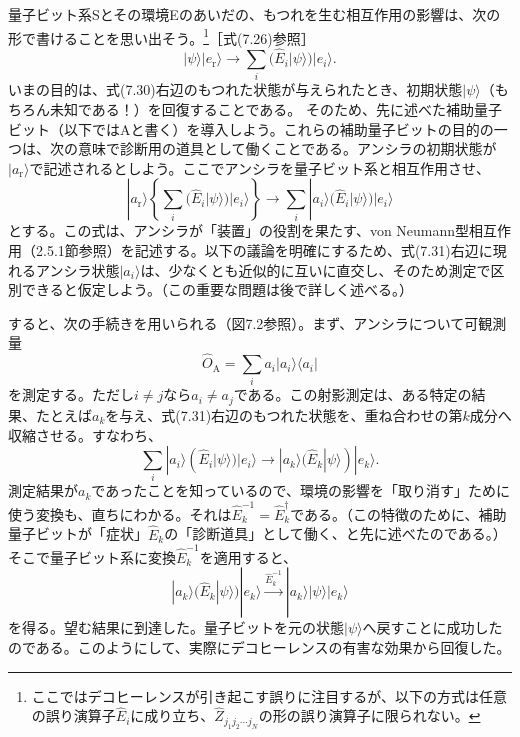 量子ビット系Sとその環境Eのあいだの、もつれを生む相互作用の影響は、次の形で書けることを思い出そう。\footnote{ここではデコヒーレンスが引き起こす誤りに注目するが、以下の方式は任意の誤り演算子$\hat E_i$に成り立ち、$\hat Z_{j_1j_2\cdots j_N}$の形の誤り演算子に限られない。}［式(7.26)参照］
\begin{equation}|\psi\rangle|e_{\mathrm r}\rangle\longrightarrow\sum_i(\hat E_i|\psi\rangle)|e_i\rangle.\tag{7.30}\end{equation}
いまの目的は、式(7.30)右辺のもつれた状態が与えられたとき、初期状態$|\psi\rangle$（もちろん未知である！）を回復することである。
\hypertarget{srcpage:312}{}\label{srcpage:312}
そのため、先に述べた補助量子ビット（以下ではAと書く）を導入しよう。これらの補助量子ビットの目的の一つは、次の意味で診断用の道具として働くことである。アンシラの初期状態が$|a_{\mathrm r}\rangle$で記述されるとしよう。ここでアンシラを量子ビット系と相互作用させ、
\begin{equation}|a_{\mathrm r}\rangle\left\{\sum_i(\hat E_i|\psi\rangle)|e_i\rangle\right\}\longrightarrow\sum_i|a_i\rangle(\hat E_i|\psi\rangle)|e_i\rangle\tag{7.31}\end{equation}
とする。この式は、アンシラが「装置」の役割を果たす、von Neumann型相互作用（2.5.1節参照）を記述する。以下の議論を明確にするため、式(7.31)右辺に現れるアンシラ状態$|a_i\rangle$は、少なくとも近似的に互いに直交し、そのため測定で区別できると仮定しよう。（この重要な問題は後で詳しく述べる。）

すると、次の手続きを用いられる（図7.2参照）。まず、アンシラについて可観測量
\begin{equation}\hat O_{\mathrm A}=\sum_i a_i|a_i\rangle\langle a_i|\tag{7.32}\end{equation}
を測定する。ただし$i\ne j$なら$a_i\ne a_j$である。この射影測定は、ある特定の結果、たとえば$a_k$を与え、式(7.31)右辺のもつれた状態を、重ね合わせの第$k$成分へ収縮させる。すなわち、
\begin{equation}\sum_i|a_i\rangle(\hat E_i|\psi\rangle)|e_i\rangle\longrightarrow|a_k\rangle(\hat E_k|\psi\rangle)|e_k\rangle.\tag{7.33}\end{equation}
測定結果が$a_k$であったことを知っているので、環境の影響を「取り消す」ために使う変換も、直ちにわかる。それは$\hat E_k^{-1}=\hat E_k^\dagger$である。（この特徴のために、補助量子ビットが「症状」$\hat E_k$の「診断道具」として働く、と先に述べたのである。）そこで量子ビット系に変換$\hat E_k^{-1}$を適用すると、
\begin{equation}|a_k\rangle(\hat E_k|\psi\rangle)|e_k\rangle\xrightarrow{\hat E_k^{-1}}|a_k\rangle|\psi\rangle|e_k\rangle\tag{7.34}\end{equation}
を得る。望む結果に到達した。量子ビットを元の状態$|\psi\rangle$へ戻すことに成功したのである。このようにして、実際にデコヒーレンスの有害な効果から回復した。

